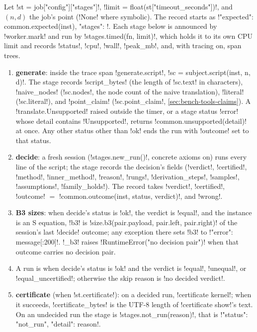 \begin{algorithm}\label{alg:bench-tools-azx-run}
Let \py!st = job["config"]["stages"]!, \py!limit = float(st["timeout_seconds"])!, and $(n,d)$ the job's point (\py!None! where symbolic). The record starts as \py!{"expected": common.expected(inst), "stages": {}}!. Each stage below is announced by \py!worker.mark! and run by \py!stages.timed(fn, limit)!, which holds it to its own CPU limit and records \code!status!, \code!cpu!, \code!wall!, \code!peak_mb!, and, with tracing on, span trees.
\begin{enumerate}
\item \textbf{generate}: inside the trace span \code!generate.script!, \py!sc = subject.script(inst, n, d)!. The stage records \code!script_bytes! (the length of \py!sc.text! in characters), \code!naive_nodes! (\py!sc.nodes!, the node count of the naive translation), \code!literal! (\py!sc.literal!), and \code!point_claim! (\py!sc.point_claim!, \cref{sec:bench-tools-claims}). A \py!translate.Unsupported! raised outside the timer, or a stage status \code!error! whose detail contains \code!Unsupported!, returns \py!common.unsupported(detail)! at once. Any other status other than \code!ok! ends the run with \code!outcome! set to that status.
\item \textbf{decide}: a fresh session (\py!stages.new_run()!, concrete axioms on) runs every line of the script; the stage records the decision's fields (\code!verdict!, \code!certified!, \code!method!, \code!inner_method!, \code!reason!, \code!rungs!, \code!derivation_steps!, \code!samples!, \code!assumptions!, \code!family_holds!). The record takes \code!verdict!, \code!certified!, \code!outcome! $=$ \py!common.outcome(inst, status, verdict)!, and \code!wrong!.
\item \textbf{B3 sizes}: when decide's status is \code!ok!, the verdict is \code!equal!, and the instance is an S equation, \code!b3! is \py!size.b3(pair.payload, pair.left, pair.right)! of the session's last \azx!decide! outcome; any exception there sets \code!b3! to \py!{"error": message[:200]}!. \py!_b3! raises \py!RuntimeError("no decision pair")! when that outcome carries no decision pair.
\item A run is  when decide's status is \code!ok! and the verdict is \code!equal!, \code!unequal!, or \code!equal_uncertified!; otherwise the skip reason is \code!no decided verdict!.
\item \textbf{certificate} (when \code!st.certificate!): on a decided run, \azx!certificate kernel!; when it succeeds, \code!certificate_bytes! is the UTF-8 length of \azx!certificate show!'s text. On an undecided run the stage is \py!stages.not_run(reason)!, that is \py!{"status": "not_run", "detail": reason}!.

\end{enumerate}
\end{algorithm}
